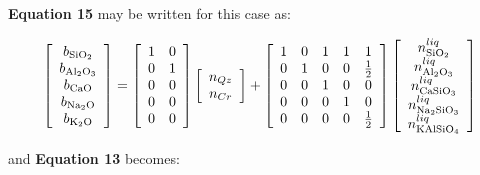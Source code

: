 \documentclass[11pt, titlepage, twoside]{article}
\begin{document}
\textbf{Equation 15} may be written for this case as:


\begin{MPEquation}[!ht]
\begin{equation}
\left[ {\begin{array}{*{20}{c}}
{{b_{{\rm{Si}}{{\rm{O}}_2}}}}\\
{{b_{{\rm{A}}{{\rm{l}}_2}{{\rm{O}}_3}}}}\\
{{b_{{\rm{CaO}}}}}\\
{{b_{{\rm{N}}{{\rm{a}}_2}{\rm{O}}}}}\\
{{b_{{{\rm{K}}_2}{\rm{O}}}}}
\end{array}} \right] = \left[ {\begin{array}{*{20}{c}}
1&0\\
0&1\\
0&0\\
0&0\\
0&0
\end{array}} \right]\left[ {\begin{array}{*{20}{c}}
{{n_{Qz}}}\\
{{n_{Cr}}}
\end{array}} \right] + \left[ {\begin{array}{*{20}{c}}
1&0&1&1&1\\
0&1&0&0&{\frac{1}{2}}\\
0&0&1&0&0\\
0&0&0&1&0\\
0&0&0&0&{\frac{1}{2}}
\end{array}} \right]\left[ {\begin{array}{*{20}{c}}
{n_{{\rm{Si}}{{\rm{O}}_2}}^{liq}}\\
{n_{{\rm{A}}{{\rm{l}}_2}{{\rm{O}}_3}}^{liq}}\\
{n_{{\rm{CaSi}}{{\rm{O}}_3}}^{liq}}\\
{n_{{\rm{N}}{{\rm{a}}_2}{\rm{Si}}{{\rm{O}}_3}}^{liq}}\\
{n_{{\rm{KAlSi}}{{\rm{O}}_4}}^{liq}}
\end{array}} \right]
\end{equation}
\label{MPEquationElement:CEC405BD-17B1-4FBF-87C8-BE118E683854}
\end{MPEquation}
and \textbf{Equation 13} becomes:
\end{document}
